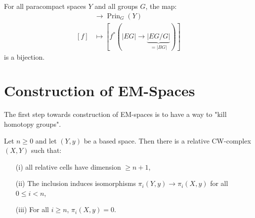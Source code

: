 \begin{theorem}
For all paracompact spaces $Y$ and all groups $G$, the map:
\begin{align*}
    [Y,|BG|]&\to \operatorname{Prin}_G(Y)\\
    [f]&\mapsto[f^*(|EG|\to\underbrace{|EG/G|}_{=|BG|})]
\end{align*}
is a bijection.
\end{theorem}

\section{Construction of EM-Spaces}

The first step towards construction of EM-spaces is to have a way to "kill homotopy groups".

\begin{theorem}\label{theorem:killing-homotopy-groups}
Let $n\geq0$ and let $(Y,y)$ be a based space. Then there is a relative CW-complex $(X,Y)$ such that:
\begin{itemize}
    \item[(i)] all relative cells have dimension $\geq n+1$,
    \item[(ii)] The inclusion induces isomorphisms $\pi_i(Y,y)\to\pi_i(X,y)$ for all $0\leq i<n$,
    \item[(iii)] For all $i\geq n$, $\pi_i(X,y)=0$.
\end{itemize}
\end{theorem}

